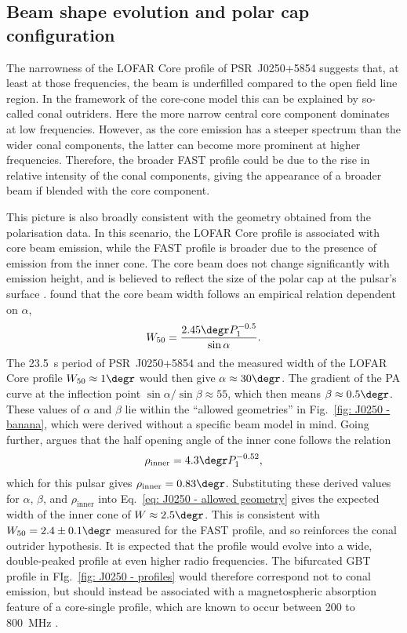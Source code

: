 \subsection{Beam shape evolution and polar cap configuration}
\label{sec: J0250 - discussion - beam shape}

The narrowness of the LOFAR Core profile of PSR~J0250+5854 suggests that, at least at those frequencies, the beam is underfilled compared to the open field line region. In the framework of the core-cone model \citep[e.g.][]{Rxxx1983a,Rxxx1983b, RRxx1990, Rxxx1993} this can be explained by so-called conal outriders. Here the more narrow central core component dominates at low frequencies. However, as the core emission has a steeper spectrum than the wider conal components, the latter can become more prominent at higher frequencies. Therefore, the broader FAST profile could be due to the rise in relative intensity of the conal components, giving the appearance of a broader beam if blended with the core component. 

This picture is also broadly consistent with the geometry obtained from the polarisation data. In this scenario, the LOFAR Core profile is associated with core beam emission, while the FAST profile is broader due to the presence of emission from the inner cone. The core beam does not change significantly with emission height, and is believed to reflect the size of the polar cap at the pulsar's surface \citep{Rxxx1983a}. \citet{Rxxx1990} found that the core beam width follows an empirical relation dependent on $\alpha$,
\begin{equation}
    \label{eq: J0250 - core beam W50}
    W_{50} =\frac{2.45\degr P_1^{-0.5}}{\sin\alpha}.
\end{equation}
The 23.5~s period of PSR~J0250+5854 and the measured width of the LOFAR Core profile $W_{50} \approx 1\degr$ would then give $\alpha \approx 30\degr$. The gradient of the PA curve at the inflection point $\sin\alpha/\sin\beta \approx 55$, which then means $\beta \approx 0.5\degr$. These values of $\alpha$ and $\beta$ lie within the ``allowed geometries'' in Fig.~\ref{fig: J0250 - banana}, which were derived without a specific beam model in mind. Going further, \citet{Rxxx1993} argues that the half opening angle of the inner cone follows the relation
\begin{equation}
    \label{eq: J0250 - inner cone rho}
    \rho_\mathrm{inner} = 4.3\degr P_1^{-0.52},
\end{equation}
which for this pulsar gives $\rho_\mathrm{inner} = 0.83\degr$. Substituting these derived values for $\alpha$, $\beta$, and $\rho_\mathrm{inner}$ into Eq.~\eqref{eq: J0250 - allowed geometry} gives the expected width of the inner cone of $W \approx 2.5\degr$. This is consistent with $W_{50} = 2.4\pm 0.1\degr$ measured for the FAST profile, and so reinforces the conal outrider hypothesis. It is expected that the profile would evolve into a wide, double-peaked profile at even higher radio frequencies. The bifurcated GBT profile in FIg.~\ref{fig: J0250 - profiles} would therefore correspond not to conal emission, but should instead be associated with a magnetospheric absorption feature of a core-single profile, which are known to occur between 200 to 800~MHz \citep[e.g.][]{Rxxx1983b, Rxxx1986}. 

